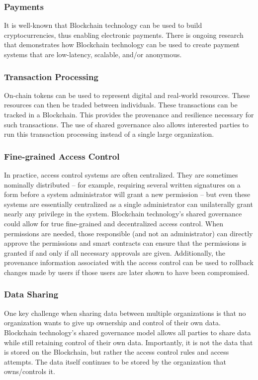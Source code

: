 \subsubsection{Payments}
It is well-known that Blockchain technology can be used to build cryptocurrencies, thus enabling electronic payments.
There is ongoing research that demonstrates how Blockchain technology can be used to create payment systems that are low-latency, scalable, and/or anonymous.

\subsubsection{Transaction Processing}
On-chain tokens can be used to represent digital and real-world resources.
These resources can then be traded between individuals.
These transactions can be tracked in a Blockchain.
This provides the provenance and resilience necessary for such transactions.
The use of shared governance also allows interested parties to run this transaction processing instead of a single large organization.

\subsubsection{Fine-grained Access Control}
In practice, access control systems are often centralized. They are sometimes nominally distributed -- for example, requiring several written signatures on a form before a system administrator will grant a new permission -- but even these systems are essentially centralized as a single administrator can unilaterally grant nearly any privilege in the system.
Blockchain technology's shared governance could allow for true fine-grained and decentralized access control.
When permissions are needed, those responsible (and not an administrator) can directly approve the permissions and smart contracts can ensure that the permissions is granted if and only if all necessary approvals are given.
Additionally, the provenance information associated with the access control can be used to rollback changes made by users if those users are later shown to have been compromised.

\subsubsection{Data Sharing}
One key challenge when sharing data between multiple organizations is that no organization wants to give up ownership and control of their own data.
Blockchain technology's shared governance model allows all parties to share data while still retaining control of their own data.
Importantly, it is not the data that is stored on the Blockchain, but rather the access control rules and access attempts.
The data itself continues to be stored by the organization that owns/controls it.


